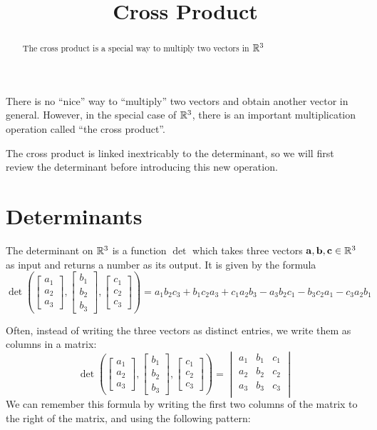 \documentclass{ximera}
\title[Dig-In:]{Cross Product}
\begin{document}
\begin{abstract}
  The cross product is a special way to multiply two vectors in $\mathbb R^3$
\end{abstract}
\maketitle

There is no ``nice'' way to ``multiply'' two vectors and obtain
another vector in general. However, in the special case of
$\mathbb R^3$, there is an important multiplication operation called
``the cross product''.

The cross product is linked inextricably to the determinant, so we
will first review the determinant before introducing this new
operation.

\section{Determinants}

\begin{definition}
  The determinant on $\mathbb R^3$ is a function $\det$ which takes three
  vectors $\mathbf{a},\mathbf{b},\mathbf{c} \in \mathbb R^3$ as input and returns a
  number as its output.  It is given by the formula
  \[
  \det\left(\begin{bmatrix} a_1 \\ a_2 \\a_3 \end{bmatrix}, \begin{bmatrix} b_1 \\ b_2 \\b_3 \end{bmatrix}, \begin{bmatrix} c_1 \\ c_2 \\c_3 \end{bmatrix} \right)  = a_1b_2c_3+b_1c_2a_3+c_1a_2b_3-a_3b_2c_1-b_3c_2a_1-c_3a_2b_1
  \]  
\end{definition}

Often, instead of writing the three vectors as distinct entries, we
write them as columns in a matrix:
\[
\det\left(\begin{bmatrix} a_1 \\ a_2 \\a_3 \end{bmatrix}, \begin{bmatrix} b_1 \\ b_2 \\b_3 \end{bmatrix}, \begin{bmatrix} c_1 \\ c_2 \\c_3 \end{bmatrix} \right) = 
\begin{vmatrix} 
  a_1 & b_1 & c_1\\
  a_2 & b_2 & c_2\\
  a_3 & b_3 & c_3\\
\end{vmatrix}
\]
We can remember this formula by writing the first two columns of the
matrix to the right of the matrix, and using the following pattern:
	
\end{document}

